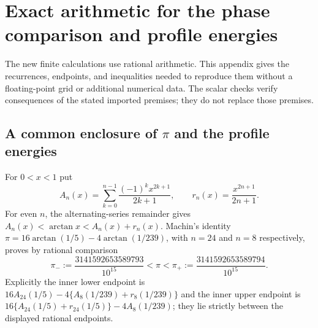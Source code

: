 \documentclass[11pt,reqno]{amsart}
\numberwithin{equation}{section}
\begin{document}
\section{Exact arithmetic for the phase comparison and profile energies}
\label{app:arithmetic}

The new finite calculations use rational arithmetic. This appendix gives
the recurrences, endpoints, and inequalities needed to reproduce them
without a floating-point grid or additional numerical data. The scalar
checks verify consequences of the stated imported premises; they do not
replace those premises.

\subsection{A common enclosure of \texorpdfstring{$\pi$}{pi} and the profile energies}

For $0<x<1$ put
\[
 A_n(x)=\sum_{k=0}^{n-1}\frac{(-1)^kx^{2k+1}}{2k+1},\qquad
 r_n(x)=\frac{x^{2n+1}}{2n+1}.
\]
For even $n$, the alternating-series remainder gives
$A_n(x)<\arctan x<A_n(x)+r_n(x)$. Machin's identity
$\pi=16\arctan(1/5)-4\arctan(1/239)$, with $n=24$ and $n=8$
respectively, proves by rational comparison
\begin{equation}
 \pi_-:=\frac{3141592653589793}{10^{15}}
 <\pi<
 \pi_+:=\frac{3141592653589794}{10^{15}}.
 \label{eq:appendix-pi}
\end{equation}
Explicitly the inner lower endpoint is
$16A_{24}(1/5)-4\{A_8(1/239)+r_8(1/239)\}$ and the inner upper
endpoint is $16\{A_{24}(1/5)+r_{24}(1/5)\}-4A_8(1/239)$;
they lie strictly between the displayed rational endpoints.
\end{document}

